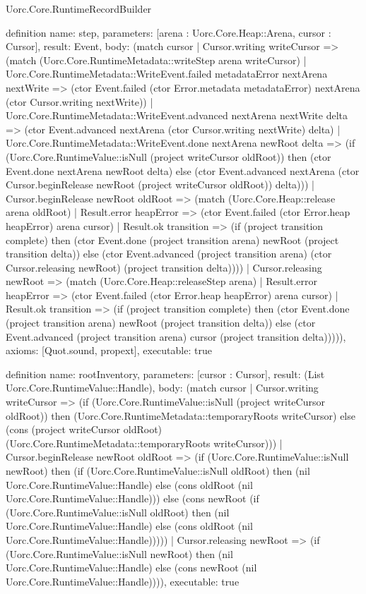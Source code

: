 \begin{lexlean}{Uorc.Core.RuntimeRecordBuilder}
\begin{semanticmodule}
definition{
  name: step,
  parameters: [arena : Uorc.Core.Heap::Arena, cursor : Cursor],
  result: Event,
  body: (match cursor
    | Cursor.writing writeCursor => (match (Uorc.Core.RuntimeMetadata::writeStep arena writeCursor)
      | Uorc.Core.RuntimeMetadata::WriteEvent.failed metadataError nextArena nextWrite => (ctor Event.failed (ctor Error.metadata metadataError) nextArena (ctor Cursor.writing nextWrite))
      | Uorc.Core.RuntimeMetadata::WriteEvent.advanced nextArena nextWrite delta => (ctor Event.advanced nextArena (ctor Cursor.writing nextWrite) delta)
      | Uorc.Core.RuntimeMetadata::WriteEvent.done nextArena newRoot delta => (if (Uorc.Core.RuntimeValue::isNull (project writeCursor oldRoot)) then (ctor Event.done nextArena newRoot delta) else (ctor Event.advanced nextArena (ctor Cursor.beginRelease newRoot (project writeCursor oldRoot)) delta)))
    | Cursor.beginRelease newRoot oldRoot => (match (Uorc.Core.Heap::release arena oldRoot)
      | Result.error heapError => (ctor Event.failed (ctor Error.heap heapError) arena cursor)
      | Result.ok transition => (if (project transition complete) then (ctor Event.done (project transition arena) newRoot (project transition delta)) else (ctor Event.advanced (project transition arena) (ctor Cursor.releasing newRoot) (project transition delta))))
    | Cursor.releasing newRoot => (match (Uorc.Core.Heap::releaseStep arena)
      | Result.error heapError => (ctor Event.failed (ctor Error.heap heapError) arena cursor)
      | Result.ok transition => (if (project transition complete) then (ctor Event.done (project transition arena) newRoot (project transition delta)) else (ctor Event.advanced (project transition arena) cursor (project transition delta))))),
  axioms: [Quot.sound, propext],
  executable: true
}

definition{
  name: rootInventory,
  parameters: [cursor : Cursor],
  result: (List Uorc.Core.RuntimeValue::Handle),
  body: (match cursor
    | Cursor.writing writeCursor => (if (Uorc.Core.RuntimeValue::isNull (project writeCursor oldRoot)) then (Uorc.Core.RuntimeMetadata::temporaryRoots writeCursor) else (cons (project writeCursor oldRoot) (Uorc.Core.RuntimeMetadata::temporaryRoots writeCursor)))
    | Cursor.beginRelease newRoot oldRoot => (if (Uorc.Core.RuntimeValue::isNull newRoot) then (if (Uorc.Core.RuntimeValue::isNull oldRoot) then (nil Uorc.Core.RuntimeValue::Handle) else (cons oldRoot (nil Uorc.Core.RuntimeValue::Handle))) else (cons newRoot (if (Uorc.Core.RuntimeValue::isNull oldRoot) then (nil Uorc.Core.RuntimeValue::Handle) else (cons oldRoot (nil Uorc.Core.RuntimeValue::Handle)))))
    | Cursor.releasing newRoot => (if (Uorc.Core.RuntimeValue::isNull newRoot) then (nil Uorc.Core.RuntimeValue::Handle) else (cons newRoot (nil Uorc.Core.RuntimeValue::Handle)))),
  executable: true
}
\end{semanticmodule}
\end{lexlean}
